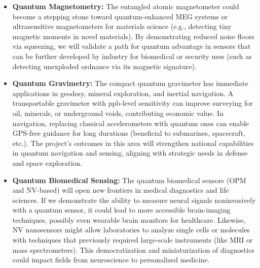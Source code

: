 \documentclass[12pt]{article}
\begin{document}
\begin{itemize}
\item \textbf{Quantum Magnetometry:} The entangled atomic magnetometer could become a stepping stone toward quantum-enhanced MEG systems or ultrasensitive magnetometers for materials science (e.g., detecting tiny magnetic moments in novel materials). By demonstrating reduced noise floors via squeezing, we will validate a path for quantum advantage in sensors that can be further developed by industry for biomedical or security uses (such as detecting unexploded ordnance via its magnetic signature).
\item \textbf{Quantum Gravimetry:} The compact quantum gravimeter has immediate applications in geodesy, mineral exploration, and inertial navigation. A transportable gravimeter with ppb-level sensitivity can improve surveying for oil, minerals, or underground voids, contributing economic value. In navigation, replacing classical accelerometers with quantum ones can enable GPS-free guidance for long durations (beneficial to submarines, spacecraft, etc.). The project’s outcomes in this area will strengthen national capabilities in quantum navigation and sensing, aligning with strategic needs in defense and space exploration.
\item \textbf{Quantum Biomedical Sensing:} The quantum biomedical sensors (OPM and NV-based) will open new frontiers in medical diagnostics and life sciences. If we demonstrate the ability to measure neural signals noninvasively with a quantum sensor, it could lead to more accessible brain-imaging techniques, possibly even wearable brain monitors for healthcare. Likewise, NV nanosensors might allow laboratories to analyze single cells or molecules with techniques that previously required large-scale instruments (like MRI or mass spectrometers). This democratization and miniaturization of diagnostics could impact fields from neuroscience to personalized medicine.
\end{itemize}
\end{document}
